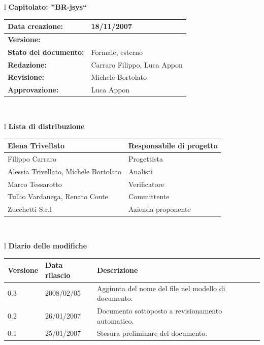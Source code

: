 \documentclass[11pt,titlepage,a4paper]{report}
\begin{document}
\begin{center}
\thispagestyle{plain}
\begin{table}[htbp]
\large{
\begin{tabular}{l}
\Large{\textbf{\textsf{Capitolato: ''BR-jsys``}}} \\
\begin{tabular}{||p{6cm}||p{6cm}||}
\hline
\textbf{Data creazione:} & 18/11/2007 \\ \hline
\textbf{Versione:} & \lv \\ \hline
\textbf{Stato del documento:} & Formale, esterno \\ \hline
\textbf{Redazione:} & Carraro Filippo, Luca Appon \\ \hline
\textbf{Revisione:} & Michele Bortolato   \\ \hline
\textbf{Approvazione:}  & Luca Appon \\ \hline
\end{tabular} \\
\end{tabular}
}
\end{table}

\begin{table}[hbtp]
\large{
\begin{tabular}{l}
\Large{\textbf{\textsf{Lista di distribuzione}}} \\
\begin{tabular}{||p{6cm}||p{6cm}||} \hline
{Elena Trivellato}& Responsabile di progetto \\ \hline 
{Filippo Carraro}& Progettista \\ \hline
{Alessia Trivellato, Michele Bortolato}& Analisti \\ \hline
{Marco Tessarotto}& Verificatore \\ \hline
{Tullio Vardanega, Renato Conte}& Committente \\ \hline 
{Zucchetti S.r.l}& Azienda proponente\\ \hline
\end{tabular} \\
\end{tabular}
}
\end{table}
\begin{table}[hbtp]
\large{
\begin{tabular}{l}
\Large{\textbf{\textsf{Diario delle modifiche}}} \\
\begin{tabular}{||p{2cm}||p{3.5cm}||p{6cm}||} \hline
\textbf{Versione} & \textbf{Data rilascio} & \textbf{Descrizione} \\ \hline
0.3 & 2008/02/05 & Aggiunta del nome del file nel modello di documento.\\ \hline
0.2 & 26/01/2007 & Documento sottoposto a revisionamento automatico.\\ \hline
0.1 & 25/01/2007 & Stesura preliminare del documento. \\ \hline


\end{tabular}
\end{tabular}}
\end{table}
\end{center}
\end{document}
